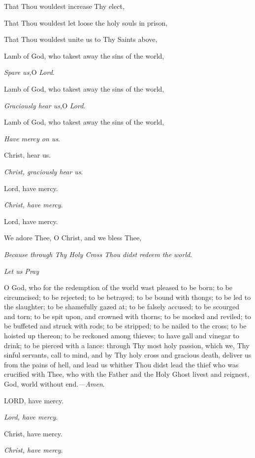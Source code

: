 That Thou wouldest increase Thy elect,

That Thou wouldest let loose the holy souls in prison,

That Thou wouldest unite us to Thy Saints above,

Lamb of God, who takest away the
sins of the world,

\emph{Spare us,}O \emph{Lord}.

Lamb of God, who takest away the sins of the world,

\emph{Graciously hear us,}O \emph{Lord}.

Lamb of God, who takest away the sins of the world, 

\emph{Have mercy on us}.

Christ, hear us.

\emph{Christ, graciously hear us}.

Lord, have mercy.

\emph{Christ, have mercy}.

Lord, have mercy.

We adore Thee, O Christ, and we
bless Thee,

\emph{Because through Thy Holy Cross Thou didst redeem the world}.

\emph{Let
us Pray}

O God, who for the redemption of
the world wast pleased to be born; to be circumcised; to be rejected; to
be betrayed; to be bound with thongs; to be led to the slaughter; to be
shamefully gazed at; to be falsely accused; to be scourged and torn; to
be spit upon, and crowned with thorns; to be mocked and reviled; to be
buffeted and struck with rods; to be stripped; to be nailed to the
cross; to be hoisted up thereon; to be reckoned among thieves; to have
gall and vinegar to drink; to be pierced with a lance: through Thy most
holy passion, which we, Thy sinful servants, call to mind, and by Thy
holy cross and gracious death, deliver us from the pains of hell, and
lead us whither Thou didst lead the thief who was crucified with Thee,
who with the Father and the Holy Ghost livest and reignest, God, world
without end.\emph{—Amen}.



LORD, have mercy.

\emph{Lord, have mercy}.

Christ, have mercy.

\emph{Christ, have mercy}.


